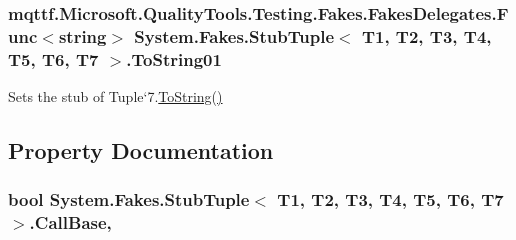 \hypertarget{class_system_1_1_fakes_1_1_stub_tuple_3_01_t1_00_01_t2_00_01_t3_00_01_t4_00_01_t5_00_01_t6_00_01_t7_01_4_a410311832576d61552f897320f36f645}{
\subsubsection[{To\-String01}]{\setlength{\rightskip}{0pt plus 5cm}mqttf.\-Microsoft.\-Quality\-Tools.\-Testing.\-Fakes.\-Fakes\-Delegates.\-Func$<$string$>$ System.\-Fakes.\-Stub\-Tuple$<$ T1, T2, T3, T4, T5, T6, T7 $>$.To\-String01}}\label{class_system_1_1_fakes_1_1_stub_tuple_3_01_t1_00_01_t2_00_01_t3_00_01_t4_00_01_t5_00_01_t6_00_01_t7_01_4_a410311832576d61552f897320f36f645}


Sets the stub of Tuple`7.\hyperlink{class_system_1_1_fakes_1_1_stub_tuple_3_01_t1_00_01_t2_00_01_t3_00_01_t4_00_01_t5_00_01_t6_00_01_t7_01_4_a249de5c8b927c986e45eec7cefb7c9e3}{To\-String()}



\subsection{Property Documentation}
\hypertarget{class_system_1_1_fakes_1_1_stub_tuple_3_01_t1_00_01_t2_00_01_t3_00_01_t4_00_01_t5_00_01_t6_00_01_t7_01_4_a4f23499691a154c6c92780c1f8fb521b}{
\subsubsection[{Call\-Base}]{\setlength{\rightskip}{0pt plus 5cm}bool System.\-Fakes.\-Stub\-Tuple$<$ T1, T2, T3, T4, T5, T6, T7 $>$.Call\-Base\hspace{0.3cm}{\ttfamily [get]}, {\ttfamily [set]}}}\label{class_system_1_1_fakes_1_1_stub_tuple_3_01_t1_00_01_t2_00_01_t3_00_01_t4_00_01_t5_00_01_t6_00_01_t7_01_4_a4f23499691a154c6c92780c1f8fb521b}


